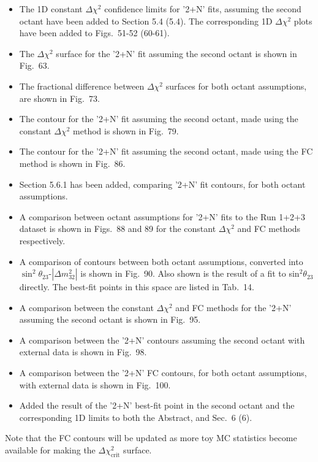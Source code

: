 \begin{itemize}
\begin{itemize}
    for the fine and coarse binning schemes respectively.
  \item The 1D constant $\Delta \chi^2$ confidence limits for '2+N' fits, assuming the second octant have been added to Section 5.4 {\color{red}(5.4)}.
    The corresponding 1D $\Delta \chi^2$ plots have been added to Figs.\ 51-52 {\color{red}(60-61)}.
  \item The $\Delta \chi^2$ surface for the '2+N' fit assuming the second octant is shown in Fig.\ {\color{red}63}.
  \item The fractional difference between $\Delta \chi^2$ surfaces for both octant assumptions, are shown in Fig.\ {\color{red}73}.
  \item The contour for the '2+N' fit assuming the second octant, made using the constant $\Delta \chi^2$ method is shown in Fig.\ {\color{red}79}.
  \item The contour for the '2+N' fit assuming the second octant, made using the FC method is shown in Fig.\ {\color{red}86}.
  \item Section {\color{red}5.6.1} has been added, comparing '2+N' fit contours, for both octant assumptions.
  \item A comparison between octant assumptions for '2+N' fits to the Run 1+2+3 dataset is shown in Figs.\ {\color{red}88} and {\color{red}89}
    for the constant $\Delta \chi^2$ and FC methods respectively.
  \item A comparison of contours between both octant assumptions, converted into $\sin^2\theta_{23}$-$|\Delta m^2_{32}|$ is shown in Fig.\ {\color{red}90}.
    Also shown is the result of a fit to sin$^2\theta_{23}$ directly. The best-fit points in this space are listed in Tab.\ {\color{red}14}.
  \item A comparison between the constant $\Delta \chi^2$ and FC methods for the '2+N' assuming the second octant is shown in Fig.\ {\color{red}95}.
  \item A comparison between the '2+N' contours assuming the second octant with external data is shown in Fig.\ {\color{red}98}.
  \item A comparison between the '2+N' FC contours, for both octant assumptions, with external data is shown in Fig.\ {\color{red}100}.
  \item Added the result of the '2+N' best-fit point in the second octant and the corresponding 1D limits to both the Abstract, and Sec.\ 6 {\color{red}(6)}.
  \end{itemize}
  Note that the FC contours will be updated as more toy MC statistics become available for making the $\Delta\chi^2_{\textrm{crit}}$ surface.
  
\end{itemize}
